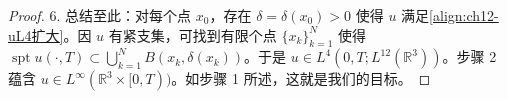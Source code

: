 \documentclass[../../main.tex]{subfiles}
\begin{document}
\begin{proof}
6. 总结至此：对每个点 $x_0$，存在 $\delta=\delta(x_0)>0$ 使得 $u$ 满足\eqref{align:ch12-uL4扩大}。因 $u$ 有紧支集，可找到有限个点 $\{x_k\}_{k=1}^N$ 使得 $\operatorname{spt}u(\cdot,T)\subset\bigcup_{k=1}^N B(x_k,\delta(x_k))$。于是 $u\in L^4(0,T;L^{12}(\mathbb{R}^3))$。步骤 2 蕴含 $u\in L^\infty(\mathbb{R}^3\times[0,T))$。如步骤 1 所述，这就是我们的目标。
\end{proof}
\end{document}
